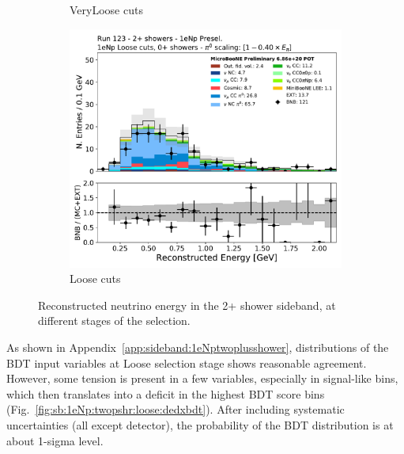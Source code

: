 \begin{figure}[H]
\begin{center}
\begin{subfigure}{0.32\textwidth}
    \caption{\npsel VeryLoose cuts}
    \end{subfigure} 
    \begin{subfigure}{0.32\textwidth}
    \includegraphics[width=1.00\textwidth]{Sidebands/Figures/1eNp/TwoShower/TwoPShr_NP_NPLAllShr_pi0e040/reco_e.pdf}
    \caption{\npsel Loose cuts}
    \end{subfigure}
    \caption{\label{fig:sb:1eNp:twopshr:recoe} Reconstructed neutrino energy in the 2+ shower sideband, at different stages of the \npsel selection.}
    \end{center}
\end{figure}

As shown in Appendix~\ref{app:sideband:1eNptwoplusshower}, distributions of the BDT input variables at Loose selection stage shows reasonable agreement. However, some tension is present in a few variables, especially in signal-like bins, which then translates into a deficit in the highest BDT score bins (Fig.~\ref{fig:sb:1eNp:twopshr:loose:dedxbdt}). After including systematic uncertainties (all except detector), the probability of the BDT distribution is at about 1-sigma level.

